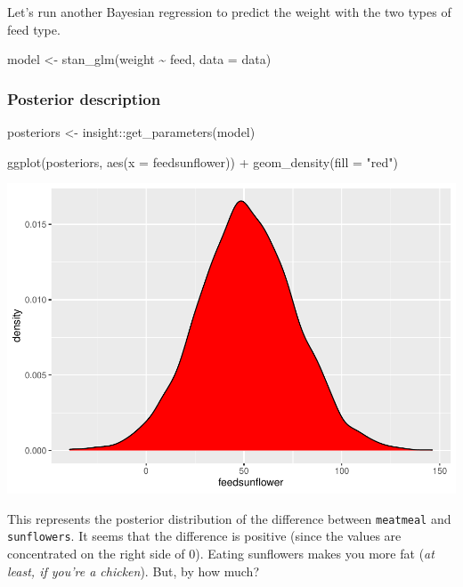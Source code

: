 \documentclass[10pt,a4paper,onecolumn]{article}
\newenvironment{Shaded}{\begin{snugshade}}{\end{snugshade}}
\newcommand{\AttributeTok}[1]{\textcolor[rgb]{0.77,0.63,0.00}{#1}}
\newcommand{\FunctionTok}[1]{\textcolor[rgb]{0.00,0.00,0.00}{#1}}
\newcommand{\NormalTok}[1]{#1}
\newcommand{\OtherTok}[1]{\textcolor[rgb]{0.56,0.35,0.01}{#1}}
\newcommand{\SpecialCharTok}[1]{\textcolor[rgb]{0.00,0.00,0.00}{#1}}
\newcommand{\StringTok}[1]{\textcolor[rgb]{0.31,0.60,0.02}{#1}}
\begin{document}
Let's run another Bayesian regression to predict the weight with the two
types of feed type.

\begin{Shaded}
\begin{Highlighting}[]
\NormalTok{model }\OtherTok{\textless{}{-}} \FunctionTok{stan\_glm}\NormalTok{(weight }\SpecialCharTok{\textasciitilde{}}\NormalTok{ feed, }\AttributeTok{data =}\NormalTok{ data)}
\end{Highlighting}
\end{Shaded}

\hypertarget{posterior-description}{%
\subsubsection{Posterior description}\label{posterior-description}}

\begin{Shaded}
\begin{Highlighting}[]
\NormalTok{posteriors }\OtherTok{\textless{}{-}}\NormalTok{ insight}\SpecialCharTok{::}\FunctionTok{get\_parameters}\NormalTok{(model)}

\FunctionTok{ggplot}\NormalTok{(posteriors, }\FunctionTok{aes}\NormalTok{(}\AttributeTok{x =}\NormalTok{ feedsunflower)) }\SpecialCharTok{+}
  \FunctionTok{geom\_density}\NormalTok{(}\AttributeTok{fill =} \StringTok{"red"}\NormalTok{)}
\end{Highlighting}
\end{Shaded}

\includegraphics[width=1\linewidth]{paper_files/figure-latex/unnamed-chunk-20-1}

This represents the posterior distribution of the difference between
\texttt{meatmeal} and \texttt{sunflowers}. It seems that the difference
is positive (since the values are concentrated on the right side of 0).
Eating sunflowers makes you more fat (\emph{at least, if you're a
chicken}). But, by how much?
\end{document}
